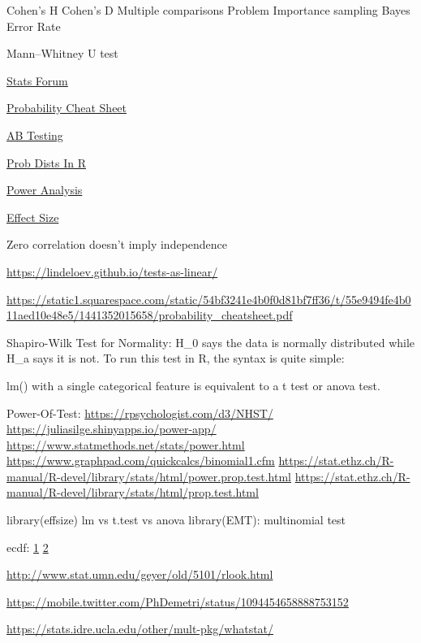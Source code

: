 \documentclass[]{book}
\begin{document}
Cohen's H \textbar{} Cohen's D \textbar{} Multiple comparisons Problem
\textbar{} Importance sampling \textbar{} Bayes Error Rate

Mann--Whitney U test

\href{https://discourse.datamethods.org/}{Stats Forum}

\href{http://www.wzchen.com/probability-cheatsheet}{Probability Cheat
Sheet}

\href{http://www.evanmiller.org/announcing-evans-awesome-ab-tools.html}{AB
Testing}

\href{http://www.cyclismo.org/tutorial/R/probability.html}{Prob Dists In
R}

\href{https://www.statmethods.net/stats/power.html}{Power Analysis}

\href{https://www.leeds.ac.uk/educol/documents/00002182.htm}{Effect
Size}

Zero correlation doesn't imply independence

\url{https://lindeloev.github.io/tests-as-linear/}

\url{https://static1.squarespace.com/static/54bf3241e4b0f0d81bf7ff36/t/55e9494fe4b011aed10e48e5/1441352015658/probability_cheatsheet.pdf}

Shapiro-Wilk Test for Normality: H\_0 says the data is normally
distributed while H\_a says it is not. To run this test in R, the syntax
is quite simple:

lm() with a single categorical feature is equivalent to a t test or
anova test.

Power-Of-Test: \url{https://rpsychologist.com/d3/NHST/}
\url{https://juliasilge.shinyapps.io/power-app/}
\url{https://www.statmethods.net/stats/power.html}
\url{https://www.graphpad.com/quickcalcs/binomial1.cfm}
\url{https://stat.ethz.ch/R-manual/R-devel/library/stats/html/power.prop.test.html}
\url{https://stat.ethz.ch/R-manual/R-devel/library/stats/html/prop.test.html}

library(effsize) lm vs t.test vs anova library(EMT): multinomial test

ecdf: \href{http://www.ericmjl.com/blog/2018/7/14/ecdfs/}{1} \textbar{}
\href{https://www.rdocumentation.org/packages/stats/versions/3.4.3/topics/ecdf}{2}

\url{http://www.stat.umn.edu/geyer/old/5101/rlook.html}

\url{https://mobile.twitter.com/PhDemetri/status/1094454658888753152}

\url{https://stats.idre.ucla.edu/other/mult-pkg/whatstat/}
\end{document}
